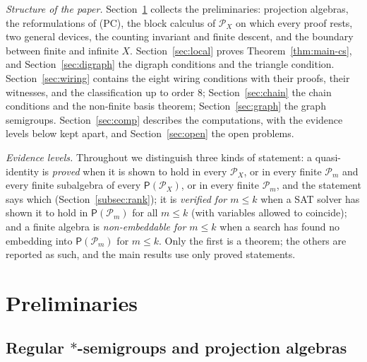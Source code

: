 \documentclass[11pt]{amsart}
\theoremstyle{definition}
\renewcommand{\P}{\mathcal{P}}      %
\newcommand{\PA}{\mathsf{P}}         %
\newcommand{\Qone}{\textup{(PC)}}     %
\begin{document}
\medskip
\noindent\emph{Structure of the paper.} Section~\ref{sec:prelim} collects the preliminaries: projection algebras, the reformulations of \Qone, the block calculus of $\P_X$ on which every proof rests, two general devices, the counting invariant and finite descent, and the boundary between finite and infinite $X$. Section~\ref{sec:local} proves Theorem~\ref{thm:main-cs}, and Section~\ref{sec:digraph} the digraph conditions and the triangle condition. Section~\ref{sec:wiring} contains the eight wiring conditions with their proofs, their witnesses, and the classification up to order $8$; Section~\ref{sec:chain} the chain conditions and the non-finite basis theorem; Section~\ref{sec:graph} the graph semigroups. Section~\ref{sec:comp} describes the computations, with the evidence levels below kept apart, and Section~\ref{sec:open} the open problems.

\medskip
\noindent\emph{Evidence levels.} Throughout we distinguish three kinds of statement: a quasi-identity is \emph{proved} when it is shown to hold in every $\P_X$, or in every finite $\P_m$ and every finite subalgebra of every $\PA(\P_X)$, or in every finite $\P_m$, and the statement says which (Section~\ref{subsec:rank}); it is \emph{verified for $m\le k$} when a SAT solver has shown it to hold in $\PA(\P_m)$ for all $m\le k$ (with variables allowed to coincide); and a finite algebra is \emph{non-embeddable for $m\le k$} when a search has found no embedding into $\PA(\P_m)$ for $m\le k$. Only the first is a theorem; the others are reported as such, and the main results use only proved statements.

\section{Preliminaries}\label{sec:prelim}

\subsection{Regular $*$-semigroups and projection algebras}\label{subsec:rss}
\end{document}
